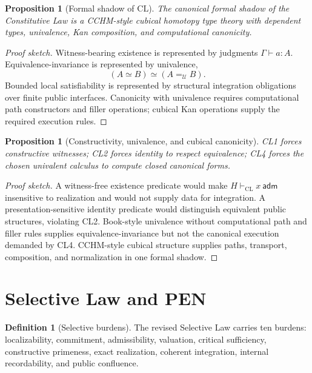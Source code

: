 \documentclass[11pt]{article}
\theoremstyle{plain}
\newtheorem{proposition}[theorem]{Proposition}
\theoremstyle{definition}
\newtheorem{definition}[theorem]{Definition}
\theoremstyle{remark}
\newenvironment{proofsketch}{\begin{proof}[Proof sketch]}{\end{proof}}
\newcommand{\CL}{\mathrm{CL}}
\newcommand{\U}{\mathcal{U}}
\begin{document}
\begin{proposition}[Formal shadow of \(\CL\)]
The canonical formal shadow of the Constitutive Law is a CCHM-style cubical homotopy type theory with dependent types, univalence, Kan composition, and computational canonicity.
\end{proposition}

\begin{proofsketch}
Witness-bearing existence is represented by judgments \(\Gamma\vdash a:A\). Equivalence-invariance is represented by univalence,
\[
(A\simeq B)\simeq (A=_{\U}B).
\]
Bounded local satisfiability is represented by structural integration obligations over finite public interfaces. Canonicity with univalence requires computational path constructors and filler operations; cubical Kan operations supply the required execution rules.
\end{proofsketch}

\begin{proposition}[Constructivity, univalence, and cubical canonicity]
CL1 forces constructive witnesses; CL2 forces identity to respect equivalence; CL4 forces the chosen univalent calculus to compute closed canonical forms.
\end{proposition}

\begin{proofsketch}
A witness-free existence predicate would make \(H\vdash_{\CL}x\ \mathsf{adm}\) insensitive to realization and would not supply data for integration. A presentation-sensitive identity predicate would distinguish equivalent public structures, violating CL2. Book-style univalence without computational path and filler rules supplies equivalence-invariance but not the canonical execution demanded by CL4. CCHM-style cubical structure supplies paths, transport, composition, and normalization in one formal shadow.
\end{proofsketch}

\section{Selective Law and PEN}

\begin{definition}[Selective burdens]
The revised Selective Law carries ten burdens: localizability, commitment, admissibility, valuation, critical sufficiency, constructive primeness, exact realization, coherent integration, internal recordability, and public confluence.
\end{definition}
\end{document}
